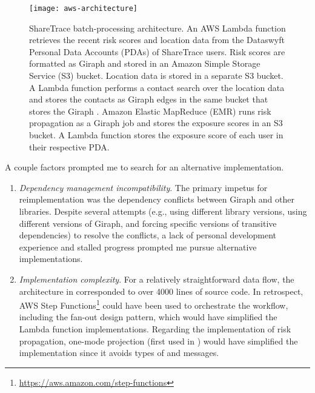 \begin{figure}[htbp]
\centering
\texttt{[image: aws-architecture]}
\caption[ShareTrace batch-processing architecture]{ShareTrace batch-processing architecture.  An AWS Lambda function\protect\footnotemark{} retrieves the recent risk scores and location data from the Dataswyft Personal Data Accounts (PDAs) of ShareTrace users. Risk scores are formatted as Giraph \verticesName and stored in an Amazon Simple Storage Service\protect\footnotemark{} (S3) bucket. Location data is stored in a separate S3 bucket.  A Lambda function performs a contact search over the location data and stores the contacts as Giraph edges in the same bucket that stores the Giraph \verticesName.  Amazon Elastic MapReduce\protect\footnotemark{} (EMR) runs risk propagation as a Giraph job and stores the exposure scores in an S3 bucket.  A Lambda function stores the exposure score of each user in their respective PDA.}
\label{fig:aws-architecture}
\end{figure}

\addtocounter{footnote}{-1}
\addtocounter{footnote}{-1}
\addtocounter{footnote}{1}
\addtocounter{footnote}{1}

\clearpage

A couple factors prompted me to search for an alternative implementation.
  \begin{enumerate}
    \item \emph{Dependency management incompatibility}. The primary impetus for reimplementation was the dependency conflicts between Giraph and other libraries. Despite several attempts (e.g., using different library versions, using different versions of Giraph, and forcing specific versions of transitive dependencies) to resolve the conflicts, a lack of personal development experience and stalled progress prompted me pursue alternative implementations.
    \item \emph{Implementation complexity}. For a relatively straightforward data flow, the architecture in  corresponded to over \num{4000} lines of source code. In retrospect, AWS Step Functions\footnote{\url{https://aws.amazon.com/step-functions}} could have been used to orchestrate the workflow, including the fan-out design pattern, which would have simplified the Lambda function implementations. Regarding the implementation of risk propagation, one-mode projection (first used in ) would have simplified the implementation since it avoids types of \verticesName and messages.
  \end{enumerate}

